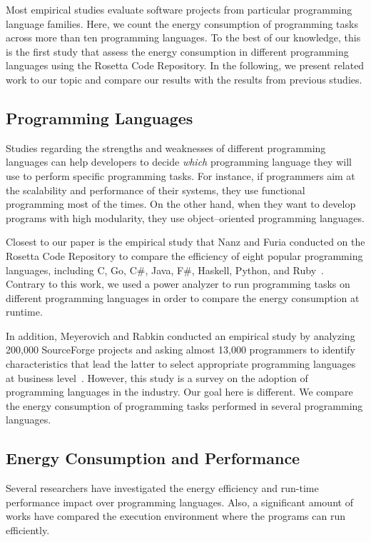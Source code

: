 Most empirical studies evaluate software projects
from particular programming language families.
Here, we count the energy consumption of
programming tasks across more than ten programming languages.
To the best of our knowledge,
this is the first study that assess
the energy consumption in different programming languages
using the Rosetta Code Repository.
In the following, we present related work to our topic
and compare our results with the results
from previous studies.

\subsection{Programming Languages}
Studies regarding the strengths and weaknesses of
different programming languages
can help developers to decide {\it which} programming language
they will use to perform specific programming tasks.
For instance, if programmers aim at the scalability
and performance of their systems,
they use functional programming most of the times.
On the other hand, when they want to develop
programs with high modularity,
they use object--oriented programming languages.

Closest to our paper is the empirical study that Nanz and Furia
conducted on the Rosetta Code Repository
to compare the efficiency of eight popular programming languages,
including C, Go, C\#, Java, F\#, Haskell, Python, and  Ruby~\cite{NF15}.
Contrary to this work,
we used a power analyzer to run programming tasks
on different programming languages
in order to compare the energy consumption at runtime.

In addition, Meyerovich and Rabkin
conducted an empirical study by analyzing
200,000 SourceForge projects
and asking almost 13,000 programmers to
identify characteristics that lead the latter
to select appropriate programming languages at business level~\cite{MR13}.
However, this study is a survey on the adoption of programming languages in the industry.
Our goal here is different.
We compare the energy consumption of programming tasks
performed in several programming languages.

\subsection{Energy Consumption and Performance}
Several researchers have investigated the energy efficiency
and run-time performance impact over
programming languages.
Also, a significant amount of works have compared the execution
environment where the programs can run efficiently.

